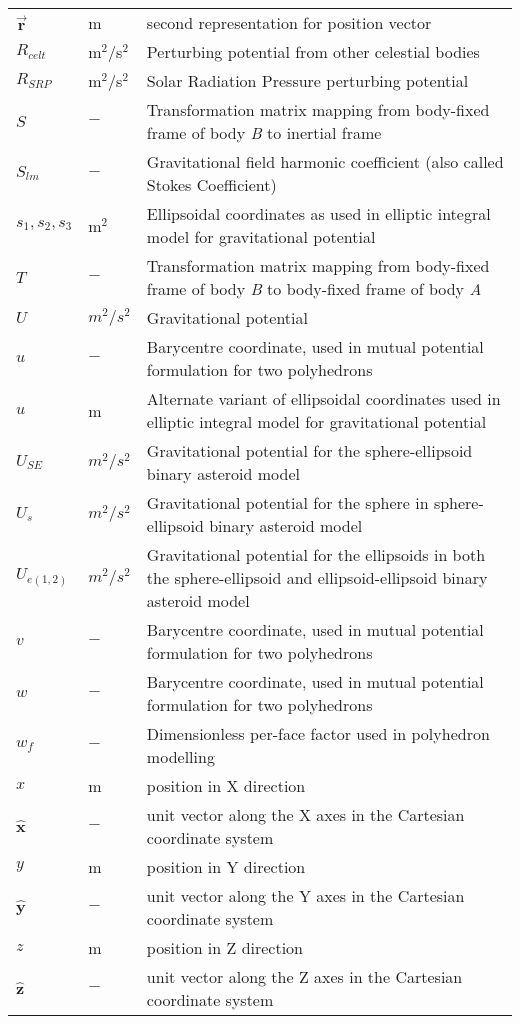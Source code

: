 \begin{longtable}[l]{p{100pt} p{70pt} p{250pt}}
$\overrightarrow{\mathbf{r}}$	& m 	& second representation for position vector\\
$R_{celt}$		& m$^2/$s$^2$	& Perturbing potential from other celestial bodies\\
$R_{SRP}$	& m$^2/$s$^2$		& Solar Radiation Pressure perturbing potential\\
$S$	& $-$	& Transformation matrix mapping from body-fixed frame of body \textit{B} to inertial frame\\
$S_{lm}$	 & $-$	& Gravitational field harmonic coefficient (also called Stokes Coefficient)\\
$s_1, s_2, s_3$		& m$^2$		& Ellipsoidal coordinates as used in elliptic integral model for gravitational potential\\
$T$	& $-$	& Transformation matrix mapping from body-fixed frame of body \textit{B} to body-fixed frame of body \textit{A}\\
$U$			& $m^2/s^2$		& Gravitational potential\\
$u$		& $-$		& Barycentre coordinate, used in mutual potential formulation for two polyhedrons	\\
$u $ &    m 		& Alternate variant of ellipsoidal coordinates used in elliptic integral model for gravitational potential\\
$U_{SE}$		& $m^2/s^2$		& Gravitational potential for the sphere-ellipsoid binary asteroid model\\
$U_{s}$		& $m^2/s^2$		& Gravitational potential for the sphere in sphere-ellipsoid binary asteroid model\\
$U_{e(1,2)}$		& $m^2/s^2$		& Gravitational potential for the ellipsoids in both the sphere-ellipsoid and ellipsoid-ellipsoid binary asteroid model\\
$v$		& $-$		& Barycentre coordinate, used in mutual potential formulation for two polyhedrons	\\
$w$		& $-$		& Barycentre coordinate, used in mutual potential formulation for two polyhedrons	\\
$w_f$		& $-$		& Dimensionless per-face factor used in polyhedron modelling\\
$x$ 		&    m	& position in X direction \\
$\mathbf{\hat{x}}$		& $-$		& unit vector along the X  axes in the Cartesian coordinate system\\
$y$  &    m		& position in Y direction \\
$ \mathbf{\hat{y}}$ & $-$		& unit vector along the  Y  axes in the Cartesian coordinate system\\
$z$ &    m 	& position in Z direction \\
$\mathbf{\hat{z}}$		& $-$		& unit vector along the Z  axes in the Cartesian coordinate system\\
\end{longtable}

